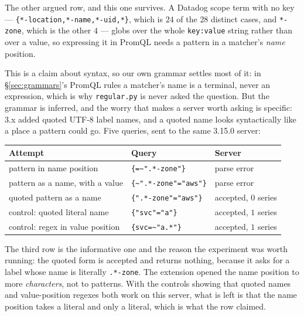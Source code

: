 \begin{remark}\label{rem:label-name}
The other argued row, and this one survives. A Datadog scope term with no key ---
\texttt{\{*-location,*-name,*-uid,*\}}, which is $24$ of the $28$ distinct cases, and
\texttt{*-zone}, which is the other $4$ --- globs over the whole \texttt{key:value}
string rather than over a value, so expressing it in PromQL needs a pattern in a
matcher's \emph{name} position.

This is a claim about syntax, so our own grammar settles most of it: in
\S\ref{sec:grammars}'s PromQL rules a matcher's name is a terminal, never an expression,
which is why \texttt{regular.py} is never asked the question. But the grammar is
inferred, and the worry that makes a server worth asking is specific: 3.x added quoted
UTF-8 label names, and a quoted name looks syntactically like a place a pattern could
go. Five queries, sent to the same 3.15.0 server:

\begin{center}\footnotesize
\begin{tabular}{@{}lll@{}}
\toprule
Attempt & Query & Server \\
\midrule
pattern in name position & \texttt{\{=\~{}".*-zone"\}} & parse error \\
pattern as a name, with a value & \texttt{\{\~{}".*-zone"="aws"\}} & parse error \\
quoted pattern as a name & \texttt{\{".*-zone"="aws"\}} & accepted, $0$ series \\
control: quoted literal name & \texttt{\{"svc"="a"\}} & accepted, $1$ series \\
control: regex in value position & \texttt{\{svc=\~{}"a.*"\}} & accepted, $1$ series \\
\bottomrule
\end{tabular}
\end{center}

\noindent
The third row is the informative one and the reason the experiment was worth running:
the quoted form is accepted and returns nothing, because it asks for a label whose name
is literally \texttt{.*-zone}. The extension opened the name position to more
\emph{characters}, not to patterns. With the controls showing that quoted names and
value-position regexes both work on this server, what is left is that the name position
takes a literal and only a literal, which is what the row claimed.
\end{remark}
